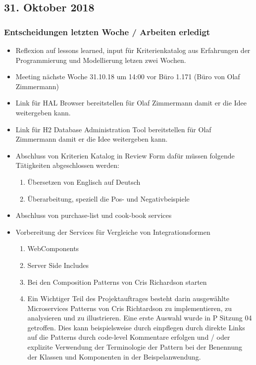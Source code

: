 \documentclass{article}
\begin{document}
    
\subsection{31. Oktober 2018} \label{chap:Protokols:1nov2018}

\subsubsection{Entscheidungen letzten Woche / Arbeiten erledigt}
\begin{itemize}
    \item Reflexion auf lessons learned, input für Kriterienkatalog aus Erfahrungen der Programmierung und Modellierung letzen zwei Wochen.
    \item Meeting nächste Woche 31.10.18 um 14:00 vor Büro 1.171 (Büro von Olaf Zimmermann) \checkmark
    \item Link für HAL Browser bereitstellen für Olaf Zimmermann damit er die Idee weitergeben kann. \checkmark
    \item Link für H2 Database Administration Tool bereitstellen für Olaf Zimmermann damit er die Idee weitergeben kann. \checkmark
    \item Abschluss von Kriterien Katalog in Review Form dafür müssen folgende Tätigkeiten abgeschlossen werden: \checkmark
    \begin{enumerate}
        \item Übersetzen von Englisch auf Deutsch \checkmark
        \item Überarbeitung, speziell die Pos- und Negativbeispiele \checkmark
    \end{enumerate}
    \item Abschluss von purchase-list und cook-book services\checkmark
    \item Vorbereitung der Services für Vergleiche von Integrationsformen
        \begin{enumerate}
            \item WebComponents
            \item Server Side Includes
            \item Bei den Composition Patterns von Cris Richardson starten\checkmark
            \item Ein Wichtiger Teil des Projektauftrages besteht darin ausgewählte Microservices Patterns von Cris Richtardson zu implementieren, zu analysieren und zu illustrieren. Eine erste Auswahl wurde in P Sitzung 04 getroffen. Dies kann beispielsweise durch einpflegen durch direkte Links auf die Patterns durch code-level Kommentare erfolgen und / oder explizite Verwendung der Terminologie der Pattern bei der Benennung der Klassen und Komponenten in der Beispelanwendung.\checkmark
        \end{enumerate}
\end{itemize}
\end{document}
